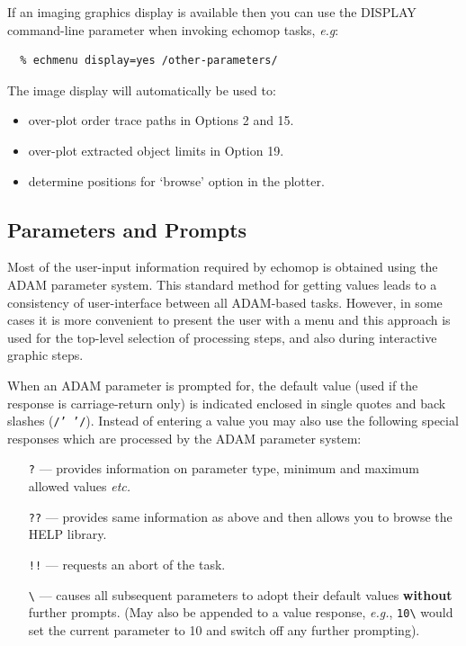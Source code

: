 \documentclass[11pt,twoside]{article}
\newcommand{\xref}[3]{#1}
\newcommand{\xlabel}[1]{}
\newcommand{\mlabel}[1]{\xlabel{#1}\label{#1}}
\newcommand{\sunspec}[2]{#1}
\renewcommand{\sunspec}[2]{#2}
\newcommand{\myindex}[1]{\index{#1}}
\renewcommand{\myindex}[1]{}
\begin{document}
If an imaging graphics display is available then you can use the
DISPLAY command-line parameter when invoking {\sc echomop} tasks, {\em e.g}:

\begin{verbatim}
  % echmenu display=yes /other-parameters/
\end{verbatim}

The image display will automatically be used to:
\myindex{Image display!use by monolith}

\begin{itemize}
\item {over-plot order trace paths in Options 2 and 15.}
\item {over-plot extracted object limits in Option 19.}
\item {determine positions for `browse' option in the plotter.}
\end{itemize}


\subsection{\mlabel{parameters_prompts}Parameters and Prompts}
\myindex{Parameters}

Most of the user-input information required by {\sc echomop} is obtained
using the \xref{ADAM parameter system}{sg4}{}.
This standard method for getting values leads to a consistency of
user-interface between all \xref{ADAM}{sg4}{}-based tasks.
However, in some cases it is more convenient to present the user with a menu
and this approach is used for the top-level selection of processing steps,
and also during interactive graphic steps.
\myindex{ADAM!parameters}
When an ADAM parameter is prompted for, the default value (used if the
response is carriage-return only) is indicated enclosed in single quotes and
back slashes ({\tt /' '/}).
Instead of entering a value you may also use the following special
responses which are processed by the ADAM parameter system:

\begin{itemize}

\item [\texttt{?}] --- provides information on parameter type, minimum and
      maximum allowed values {\it etc.}

\item [\texttt{??}] ---  provides same information as above and then allows
      you to browse the HELP library.

\item [\texttt{!!}] --- \myindex{Abort!option}\myindex{Option!abort}
      requests an abort of the task.

\item [\sunspec{$\backslash$}{\texttt{\backslash}}] ---
      \myindex{Prompt!disabling} causes all
      subsequent parameters to adopt their default values {\bf without}
      further prompts. (May also be appended to a value response, {\it
      {e.g.}}, \verb+10\+ would set the current parameter to 10 and
      switch off any further prompting).

\end{itemize}
\end{document}
